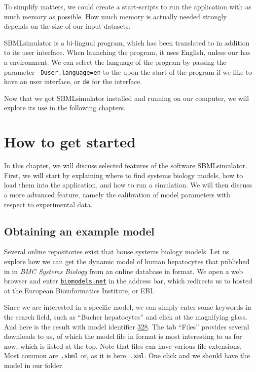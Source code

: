 To simplify matters, we could create a start-scripts to run the application with as much memory as possible.
How much memory is actually needed strongly depends on the size of our input datasets.

SBMLsimulator is a bi-lingual program, which has been translated to \German in addition to its \English user interface.
When launching the program, it uses English, unless our \OS has a \German environment.
We can select the language of the program by passing the parameter \texttt{-Duser.language=en} to the \JVM upon the start of the program if we like to have an \English user interface, or \texttt{de} for the \German interface.

Now that we got SBMLsimulator installed and running on our computer, we will explore its use in the following chapters.


\chapter{How to get started}

In this chapter, we will discuss selected features of the software SBMLsimulator.
First, we will start by explaining where to find systems biology models, how to load them into the application, and how to run a simulation.
We will then discuss a more advanced feature, namely the calibration of model parameters with respect to experimental data.

\section{Obtaining an example model}

Several online repositories exist that house systems biology models.
Let us explore how we can get the dynamic model of human hepatocytes that \citeauthor{Bucher2011} published in \citeyear{Bucher2011} in \emph{BMC Systems Biology} from an online database in \SBML format.
We open a web browser and enter \href{http://www.ebi.ac.uk/biomodels/}{\texttt{biomodels.net}} in the address bar, which redirects us to \BioModels \citep{Malik-Sheriff2019} hosted at the European Bioinformatics Institute, or EBI.

Since we are interested in a specific model, we can simply enter some keywords in the search field, such as ``Bucher hepatocytes'' and click at the magnifying glass.
And here is the result with model identifier \numero \href{https://identifiers.org/biomodels.db/BIOMD0000000328}{328}.
The tab ``Files'' provides several downloads to us, of which the model file in \SBML format is most interesting to us for now, which is listed at the top.
Note that \SBML files can have various file extensions.
Most common are \texttt{.sbml} or, as it is here, \texttt{.xml}.
One click and we should have the model in our  folder.

